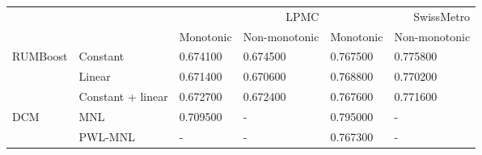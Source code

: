 \begin{tabular}{llllll}
\toprule
 &  & \multicolumn{2}{r}{LPMC} & \multicolumn{2}{r}{SwissMetro} \\
 &  & Monotonic & Non-monotonic & Monotonic & Non-monotonic \\
\midrule
\multirow[t]{3}{*}{RUMBoost} & Constant & 0.674100 & 0.674500 & 0.767500 & 0.775800 \\
 & Linear & 0.671400 & 0.670600 & 0.768800 & 0.770200 \\
 & Constant + linear & 0.672700 & 0.672400 & 0.767600 & 0.771600 \\
\cline{1-6}
\multirow[t]{2}{*}{DCM} & MNL & 0.709500 & - & 0.795000 & - \\
 & PWL-MNL & - & - & 0.767300 & - \\
\cline{1-6}
\bottomrule
\end{tabular}
